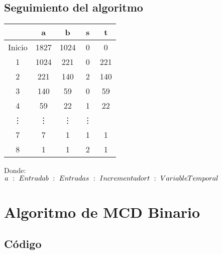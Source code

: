 \documentclass[11pt, conference]{IEEEtran}
\begin{document}
\subsection{Seguimiento del algoritmo}
\begin{center}
	\begin{tabular}{|c|c|c|c|c|}
		\hline
		& \textbf{a}& \textbf{b} & \textbf{s} & \textbf{t} \\	\hline
		Inicio & 1827 & 1024 & 0 & 0\\ \hline
		1 & 1024 & 221 & 0 & 221\\ \hline
		2 & 221 & 140 & 2 & 140\\ \hline
		3 & 140 & 59 & 0 & 59\\ \hline
		4 & 59 & 22 & 1 & 22\\ \hline
		\vdots & \vdots & \vdots & \vdots \\ \hline
		7 & 7 & 1 & 1 & 1\\ \hline
		8 & 1 & 1 & 2 & 1\\ \hline
	\end{tabular}
\end{center}
Donde:\\
$
a\ :\ Entrada \\
b\ :\ Entrada \\
s\ :\ Incrementador \\
t\ :\ Variable Temporal \\
$

\section{Algoritmo de MCD Binario}
\subsection{Código}
\end{document}
